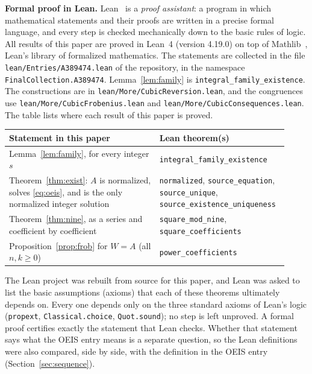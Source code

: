 \documentclass[11pt,a4paper]{article}
\theoremstyle{definition}
\theoremstyle{remark}
\newcommand{\para}[1]{\par\medskip\noindent\textbf{#1}\enspace}
\begin{document}
\para{Formal proof in Lean.}
Lean~\cite{lean} is a \emph{proof assistant}: a program in which mathematical statements and their proofs are written
in a precise formal language, and every step is checked mechanically down to the basic rules of logic. All results of
this paper are proved in Lean~4 (version 4.19.0) on top of Mathlib~\cite{mathlib}, Lean's library of formalized
mathematics. The statements are collected in the file \texttt{lean/Entries/A389474.lean} of the repository,
in the namespace \texttt{FinalCollection.A389474}. Lemma~\ref{lem:family} is \texttt{integral\_family\_existence}. The constructions are in \texttt{lean/More/CubicReversion.lean}, and the congruences use \texttt{lean/More/CubicFrobenius.lean} and \texttt{lean/More/CubicConsequences.lean}.
The table lists where each result of this paper is proved.
\begin{center}\small\renewcommand{\arraystretch}{1.25}
\begin{tabular}{>{\raggedright\arraybackslash}p{0.52\linewidth}>{\raggedright\arraybackslash}p{0.4\linewidth}}
\toprule
Statement in this paper & Lean theorem(s)\\
\midrule
Lemma~\ref{lem:family}, for every integer $s$ & \texttt{integral\_\allowbreak{}family\_\allowbreak{}existence} \\
Theorem~\ref{thm:exist}: $A$ is normalized, solves \eqref{eq:oeis}, and is the only normalized integer solution & \texttt{normalized}, \texttt{source\_\allowbreak{}equation}, \texttt{source\_\allowbreak{}unique}, \texttt{source\_\allowbreak{}existence\_\allowbreak{}uniqueness} \\
Theorem~\ref{thm:nine}, as a series and coefficient by coefficient & \texttt{square\_\allowbreak{}mod\_\allowbreak{}nine}, \texttt{square\_\allowbreak{}coefficients} \\
Proposition~\ref{prop:frob} for $W=A$ (all $n,k\ge0$) & \texttt{power\_\allowbreak{}coefficients} \\
\bottomrule
\end{tabular}
\end{center}
The Lean project was rebuilt from source for this paper, and Lean was asked to list the basic assumptions (axioms)
that each of these theorems ultimately depends on. Every one depends only on the three standard axioms of Lean's logic
(\texttt{propext}, \texttt{Classical.choice}, \texttt{Quot.sound}); no step is left unproved. A formal proof certifies
exactly the statement that Lean checks. Whether that statement says what the OEIS entry means is a separate question,
so the Lean definitions were also compared, side by side, with the definition in the OEIS entry
(Section~\ref{sec:sequence}).
\end{document}
